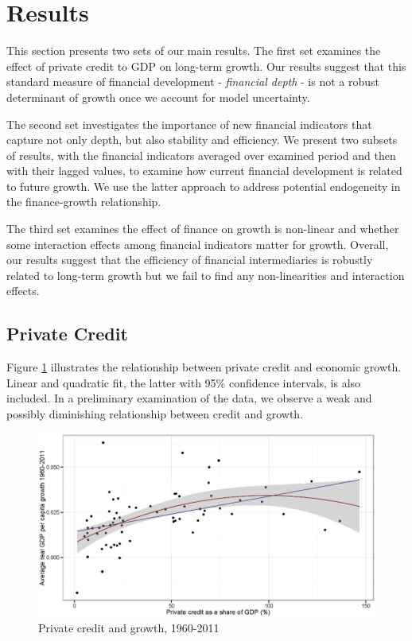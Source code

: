 \section{Results}
\label{ch2sec:Results}
This section presents two sets of our main results. The first set examines the effect of private credit to GDP on long-term growth. Our results suggest that this standard measure of financial development - \textit{financial depth} - is not a robust determinant of growth once we account for model uncertainty.

The second set investigates the importance of new financial indicators that capture not only depth, but also stability and efficiency. We present two subsets of results, with the financial indicators averaged over examined period and then with their lagged values, to examine how current financial development is related to future growth. We use the latter approach to address potential endogeneity in the finance-growth relationship. 

The third set examines the effect of finance on growth is non-linear and whether some interaction effects among financial indicators matter for growth. Overall, our results suggest that the efficiency of financial intermediaries is robustly related to long-term growth but we fail to find any non-linearities and interaction effects.

%
%
\subsection{Private Credit}
\label{ch2subsec:PC}
%
Figure \ref{ch2fig:OLSPCGDP} illustrates the relationship between private credit and economic growth. Linear and quadratic fit, the latter with 95\% confidence intervals, is also included. In a preliminary examination of the data, we observe a weak and possibly diminishing relationship between credit and growth.
%
\begin{figure}[!ht]
	\begin{center}
		\setlength{\fboxsep}{0pt}
		\includegraphics[width=\linewidth]{Figures/ch2/PConGDP1960-2011.eps}
		\caption{Private credit and growth, 1960-2011}
		\label{ch2fig:OLSPCGDP}
	\end{center}
\end{figure}

